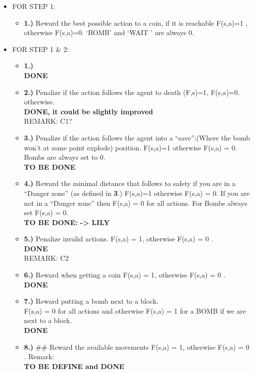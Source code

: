 \documentclass[a4paper]{article}
\begin{document}
\begin{itemize}

\item FOR STEP 1:
\begin{itemize} 
\item \textbf{1.)} Reward the best possible action to a coin, if it is reachable F(s,a)=1 ,  otherwise F(s,a)=0.    `BOMB' and `WAIT ' are always 0.
\end{itemize}

\item FOR STEP 1 \& 2:
\begin {itemize}
\item \textbf{1.)} \\  \textbf{DONE}  
\item  \textbf{2.)} Penalize if the action follows the agent to death (F,s)=1, F(s,a)=0. otherwise.  \\ \textbf{DONE, it could be slightly improved} \\
REMARK: C1?
\item \textbf{3.)} Penalize if the action follows the agent into a ``save'':(Where the bomb won't at some point explode) position.  F(s,a)=1 otherwise F(s,a) = 0.  Bombs are always set to 0.
 \\  \textbf{TO BE DONE}  
 \item \textbf{4.)}  Reward the minimal distance that follows to safety if you are in a ``Danger zone'' (as defined in \textbf{3}.)  F(s,a)=1 otherwise F(s,a) = 0.
 If you are not in a ``Danger zone'' then F(s,a) =  0 for all actions.  For Bombs always set F(s,a) = 0.
  \\  \textbf{TO BE DONE: -> LILY}  
  \item \textbf{5.)} Penalize invalid actions.  F(s,a) = 1, otherwise F(s,a) = 0 .  
 \\  \textbf{DONE}  \\REMARK: C2
   \item \textbf{6.)} Reward when getting a coin F(s,a) = 1, otherwise F(s,a) = 0 .  
 \\  \textbf{DONE}  
 
    \item \textbf{7.)} Reward putting a bomb next to a block. \\ 
	 F(s,a) = 0 for all actions and otherwise F(s,a) = 1 for a BOMB if we are next to a block.  \\
	\textbf{DONE}  
 
     \item \textbf{8.)} \#\# Reward the available movements F(s,a) = 1, otherwise F(s,a) = 0 .   
     Remark:
 \\  \textbf{TO BE DEFINE and DONE}   
 

\end{itemize}
\end{itemize}
\end{document}
